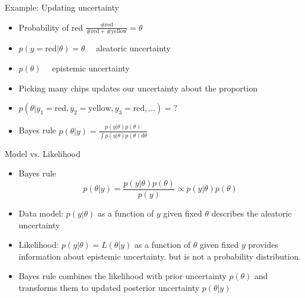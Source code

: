 \documentclass[10pt]{beamer}
\begin{document}
\begin{frame}{Example: Updating uncertainty}

  \begin{itemize}
  \item<2-> Probability of red $\frac{\mathrm{\#red}}{\mathrm{\#red+\#yellow}}=\theta$
    \vspace{\baselineskip}
  \item<3-> $p(y=\mathrm{red}|\theta)=\theta \quad$ aleatoric uncertainty
    \vspace{\baselineskip}
  \item<4-> $p(\theta) \quad$ epistemic uncertainty
    \vspace{\baselineskip}
  \item<5-> Picking many chips updates our uncertainty about the proportion
    \vspace{\baselineskip}
  \item<5-> $p(\theta|y_1=\mathrm{red},y_2=\mathrm{yellow},y_3=\mathrm{red},\ldots)=?$
    \vspace{\baselineskip}
  \item<6-> Bayes rule
      $p(\theta|y)=\frac{p(y|\theta)p(\theta)}{\int p(y|\theta)p(\theta) d\theta}$
  \end{itemize}
\end{frame}


\begin{frame}{Model vs. Likelihood}
  \begin{itemize}
  \item Bayes rule
      \[
      p(\theta|y) = \frac{p(y|\theta)p(\theta)}{p(y)} \propto p(y|\theta)p(\theta)
      \]
    \vspace{\baselineskip}
  \item Data model: $p(y|\theta)$ as a function of $y$ given fixed $\theta$
    describes the {\color{uured} aleatoric} uncertainty \vspace{\baselineskip}
  \item Likelihood: $p(y|\theta)=L(\theta|y)$
    as a function of $\theta$
    given fixed $y$ provides information about epistemic uncertainty.%
    but is not a probability distribution. %
    \vspace{\baselineskip}
  \item<2-> Bayes rule combines the likelihood with prior uncertainty
    $p(\theta)$ and transforms them to updated posterior uncertainty $p(\theta|y)$
  \end{itemize}
\end{frame}
\end{document}

